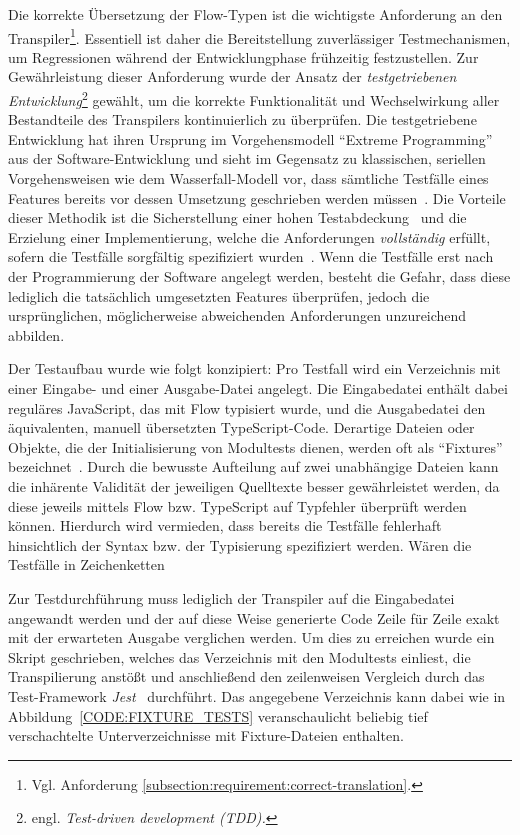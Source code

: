 Die korrekte Übersetzung der Flow-Typen ist die wichtigste Anforderung an den Transpiler\footnote{Vgl. Anforderung \ref{subsection:requirement:correct-translation}.}. Essentiell ist daher die Bereitstellung zuverlässiger Testmechanismen, um Regressionen während der Entwicklungphase frühzeitig festzustellen. Zur Gewährleistung dieser Anforderung wurde der Ansatz der \emph{testgetriebenen Entwicklung}\footnote{engl. \textit{Test-driven development (TDD).}} gewählt, um die korrekte Funktionalität und Wechselwirkung aller Bestandteile des Transpilers kontinuierlich zu überprüfen. Die testgetriebene Entwicklung hat ihren Ursprung im Vorgehensmodell \enquote{Extreme Programming}~\autocite{JEFFRIES:EXTREME_PROGRAMMING} aus der Software-Entwicklung und sieht im Gegensatz zu klassischen, seriellen Vorgehensweisen wie dem Wasserfall-Modell vor, dass sämtliche Testfälle eines Features bereits vor dessen Umsetzung geschrieben werden müssen~\autocite{BECK:EXTREME_PROGRAMMING}. Die Vorteile dieser Methodik ist die Sicherstellung einer hohen Testabdeckung~\autocite[90]{BECK:TDD} und die Erzielung einer Implementierung, welche die Anforderungen \emph{vollständig} erfüllt, sofern die Testfälle sorgfältig spezifiziert wurden~\autocite[214]{BECK:TDD}. Wenn die Testfälle erst nach der Programmierung der Software angelegt werden, besteht die Gefahr, dass diese lediglich die tatsächlich umgesetzten Features überprüfen, jedoch die ursprünglichen, möglicherweise abweichenden Anforderungen unzureichend abbilden.

Der Testaufbau wurde wie folgt konzipiert: Pro Testfall wird ein Verzeichnis mit einer Ein\-gabe- und einer Ausgabe-Datei angelegt. Die Eingabedatei enthält dabei reguläres JavaScript, das mit Flow typisiert wurde, und die Ausgabedatei den äquivalenten, manuell übersetzten TypeScript-Code. Derartige Dateien oder Objekte, die der Initialisierung von Modultests dienen, werden oft als \enquote{Fixtures} bezeichnet~\autocite{OLAN:2003}. Durch die bewusste Aufteilung auf zwei unabhängige Dateien kann die inhärente Validität der jeweiligen Quelltexte besser gewährleistet werden, da diese jeweils mittels Flow bzw. TypeScript auf Typfehler überprüft werden können. Hierdurch wird vermieden, dass bereits die Testfälle fehlerhaft hinsichtlich der Syntax bzw. der Typisierung spezifiziert werden. Wären die Testfälle in Zeichenketten

Zur Testdurchführung muss lediglich der Transpiler auf die Eingabedatei angewandt werden und der auf diese Weise generierte Code Zeile für Zeile exakt mit der erwarteten Ausgabe verglichen werden. Um dies zu erreichen wurde ein Skript geschrieben, welches das Verzeichnis mit den Modultests einliest, die Transpilierung anstößt und anschließend den zeilenweisen Vergleich durch das Test-Framework \textit{Jest}~\autocite{SOFTWARE:JEST} durchführt. Das angegebene Verzeichnis kann dabei wie in Abbildung~\ref{CODE:FIXTURE_TESTS} veranschaulicht beliebig tief verschachtelte Unterverzeichnisse mit Fixture-Dateien enthalten.

